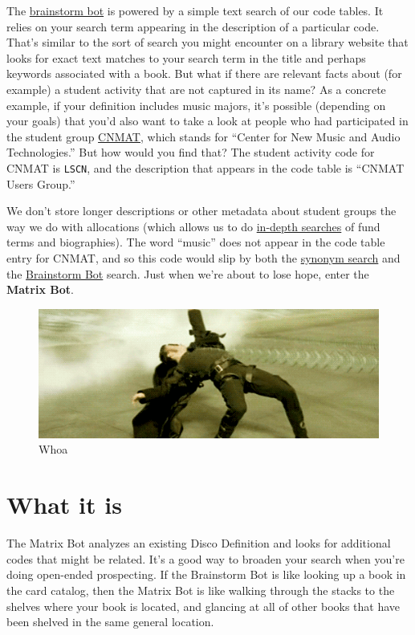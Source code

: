 \documentclass[]{book}
\begin{document}
The \protect\hyperlink{brainstorm-bot}{brainstorm bot} is powered by a simple text search of our code tables. It relies on your search term appearing in the description of a particular code. That's similar to the sort of search you might encounter on a library website that looks for exact text matches to your search term in the title and perhaps keywords associated with a book. But what if there are relevant facts about (for example) a student activity that are not captured in its name? As a concrete example, if your definition includes music majors, it's possible (depending on your goals) that you'd also want to take a look at people who had participated in the student group \href{http://cnmat.berkeley.edu/}{CNMAT}, which stands for ``Center for New Music and Audio Technologies.'' But how would you find that? The student activity code for CNMAT is \texttt{LSCN}, and the description that appears in the code table is ``CNMAT Users Group.''

We don't store longer descriptions or other metadata about student groups the way we do with allocations (which allows us to do \protect\hyperlink{searching-fund-text}{in-depth searches} of fund terms and biographies). The word ``music'' does not appear in the code table entry for CNMAT, and so this code would slip by both the \protect\hyperlink{synonym-search}{synonym search} and the \protect\hyperlink{brainstorm-bot}{Brainstorm Bot} search. Just when we're about to lose hope, enter the \textbf{Matrix Bot}.

\begin{figure}
\centering
\includegraphics{images/neo.gif}
\caption{Whoa}
\end{figure}

\hypertarget{what-it-is}{%
\section{What it is}\label{what-it-is}}

The Matrix Bot analyzes an existing Disco Definition and looks for additional codes that might be related. It's a good way to broaden your search when you're doing open-ended prospecting. If the Brainstorm Bot is like looking up a book in the card catalog, then the Matrix Bot is like walking through the stacks to the shelves where your book is located, and glancing at all of other books that have been shelved in the same general location.
\end{document}
